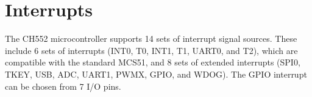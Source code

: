 \documentclass[letterpaper,10pt,english]{sphinxmanual}
\begin{document}
\begin{sphinxVerbatim}[commandchars=\\\{\}]
  
 
   

  
 
                              
                                   

                              

 

\end{sphinxVerbatim}

\sphinxstepscope


\chapter{Interrupts}
\label{\detokenize{interrupts:interrupts}}\label{\detokenize{interrupts::doc}}
\sphinxAtStartPar
The CH552 microcontroller supports 14 sets of interrupt signal sources. These include 6 sets of interrupts
(INT0, T0, INT1, T1, UART0, and T2), which are compatible with the standard MCS51, and 8 sets of extended
interrupts (SPI0, TKEY, USB, ADC, UART1, PWMX, GPIO, and WDOG). The GPIO interrupt can be chosen from 7 I/O
pins.
\end{document}
